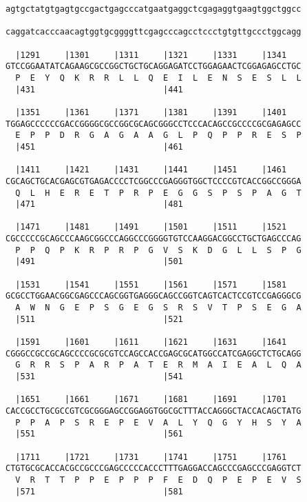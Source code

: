 \documentclass{article}
\begin{document}
\begin{Verbatim}
agtgctatgtgagtgccgactgagcccatgaatgaggctcgagaggtgaagtggctggcc
                                                            
caggatcacccaacagtggtgcggggttcgagcccagcctccctgtgttgccctggcagg
                                                            
  |1291     |1301     |1311     |1321     |1331     |1341   
GTCCGGAATATCAGAAGCGCCGGCTGCTGCAGGAGATCCTGGAGAACTCGGAGAGCCTGC
  P  E  Y  Q  K  R  R  L  L  Q  E  I  L  E  N  S  E  S  L  L
  |431                          |441                        
  
  |1351     |1361     |1371     |1381     |1391     |1401   
TGGAGCCCCCCGACCGGGGCGCCGGCGCAGCGGGCCTCCCACAGCCGCCCCGCGAGAGCC
  E  P  P  D  R  G  A  G  A  A  G  L  P  Q  P  P  R  E  S  P
  |451                          |461                        
  
  |1411     |1421     |1431     |1441     |1451     |1461   
CGCAGCTGCACGAGCGTGAGACCCCTCGGCCCGAGGGTGGCTCCCCGTCACCGGCCGGGA
  Q  L  H  E  R  E  T  P  R  P  E  G  G  S  P  S  P  A  G  T
  |471                          |481                        
  
  |1471     |1481     |1491     |1501     |1511     |1521   
CGCCCCCGCAGCCCAAGCGGCCCAGGCCCGGGGTGTCCAAGGACGGCCTGCTGAGCCCAG
  P  P  Q  P  K  R  P  R  P  G  V  S  K  D  G  L  L  S  P  G
  |491                          |501                        
  
  |1531     |1541     |1551     |1561     |1571     |1581   
GCGCCTGGAACGGCGAGCCCAGCGGTGAGGGCAGCCGGTCAGTCACTCCGTCCGAGGGCG
  A  W  N  G  E  P  S  G  E  G  S  R  S  V  T  P  S  E  G  A
  |511                          |521                        
  
  |1591     |1601     |1611     |1621     |1631     |1641   
CGGGCCGCCGCAGCCCCGCGCGTCCAGCCACCGAGCGCATGGCCATCGAGGCTCTGCAGG
  G  R  R  S  P  A  R  P  A  T  E  R  M  A  I  E  A  L  Q  A
  |531                          |541                        
  
  |1651     |1661     |1671     |1681     |1691     |1701   
CACCGCCTGCGCCGTCGCGGGAGCCGGAGGTGGCGCTTTACCAGGGCTACCACAGCTATG
  P  P  A  P  S  R  E  P  E  V  A  L  Y  Q  G  Y  H  S  Y  A
  |551                          |561                        
  
  |1711     |1721     |1731     |1741     |1751     |1761   
CTGTGCGCACCACGCCGCCCGAGCCCCCACCCTTTGAGGACCAGCCCGAGCCCGAGGTCT
  V  R  T  T  P  P  E  P  P  P  F  E  D  Q  P  E  P  E  V  S
  |571                          |581                        
  

\end{Verbatim}
\end{document}

